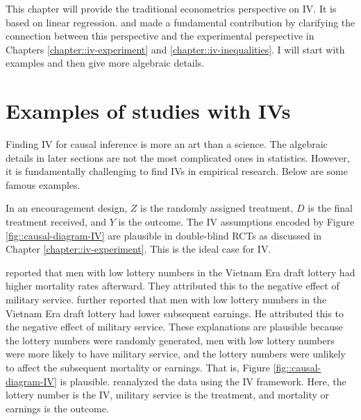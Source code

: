 This chapter will provide the traditional econometrics perspective on IV. It is based on linear regression. \citet{imbens1994identification} and \citet{angrist1996identification} made a fundamental contribution by clarifying the connection between this perspective and the experimental perspective in Chapters \ref{chapter::iv-experiment} and \ref{chapter::iv-inequalities}. I will start with examples and then give more algebraic details. 



\section{Examples of studies with IVs}
 
 
 
Finding IV for causal inference is more an art than a science. The algebraic details in later sections are not the most complicated ones in statistics. However, it is fundamentally challenging to find IVs in empirical research. Below are some famous examples.  


\begin{example} 
In an encouragement design, $Z$ is the randomly assigned treatment, $D$ is the final treatment received, and $Y$ is the outcome. The IV assumptions encoded by Figure \ref{fig::causal-diagram-IV} are plausible in double-blind RCTs as discussed in Chapter \ref{chapter::iv-experiment}. This is the ideal case for IV. 
\end{example}


 
 
 \begin{example}
 \citet{hearst1986delayed}   reported that men with low lottery numbers in the Vietnam Era draft lottery had higher mortality rates afterward.  They attributed this to the negative effect of military service.
 \citet{angrist1990lifetime} further reported that men with low lottery numbers in the Vietnam Era draft lottery had lower subsequent earnings. He attributed this to the negative effect of military service. 
 These explanations are plausible because the lottery numbers were randomly generated, men with low lottery numbers were more likely to have military service, and the lottery numbers were unlikely to affect the subsequent mortality or earnings. That is, Figure \ref{fig::causal-diagram-IV} is plausible. 
\citet{angrist1996identification} reanalyzed the data using the IV framework. Here, the lottery number is the IV, military service is the treatment, and mortality or earnings is the outcome. 
\end{example}




